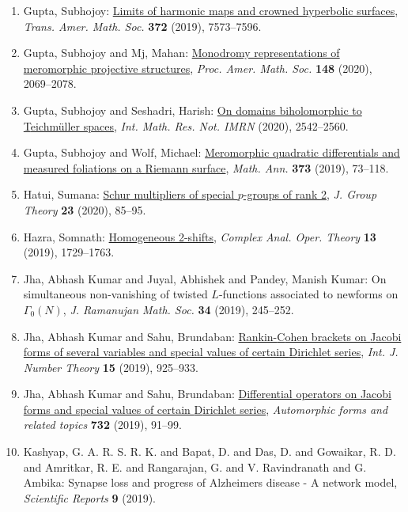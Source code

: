 \begin{enumerate}
{multishifts}, \emph{Proc. Amer. Math. Soc.} {\bf 147} (2019), 2599--2608.
\item Gupta, Subhojoy: \href{https://doi.org/10.1090/tran/7777}{Limits of harmonic maps and crowned hyperbolic surfaces}, \emph{Trans. Amer. Math. Soc.} {\bf 372} (2019), 7573--7596.
\item Gupta, Subhojoy and Mj, Mahan: \href{https://doi.org/10.1090/proc/14866}{Monodromy representations of meromorphic projective
structures}, \emph{Proc. Amer. Math. Soc.} {\bf 148} (2020), 2069--2078.
\item Gupta, Subhojoy and Seshadri, Harish: \href{https://doi.org/10.1093/imrn/rny204}{On domains biholomorphic to {T}eichm\"{u}ller spaces}, \emph{Int. Math. Res. Not. IMRN} {\bf } (2020), 2542--2560.
\item Gupta, Subhojoy and Wolf, Michael: \href{https://doi.org/10.1007/s00208-018-1674-z}{Meromorphic quadratic differentials and measured foliations on
a {R}iemann surface}, \emph{Math. Ann.} {\bf 373} (2019), 73--118.
\item Hatui, Sumana: \href{https://doi.org/10.1515/jgth-2019-0045}{Schur multipliers of special {$p$}-groups of rank 2}, \emph{J. Group Theory} {\bf 23} (2020), 85--95.
\item Hazra, Somnath: \href{https://doi.org/10.1007/s11785-018-0822-5}{Homogeneous 2-shifts}, \emph{Complex Anal. Oper. Theory} {\bf 13} (2019), 1729--1763.
\item Jha, Abhash Kumar and Juyal, Abhishek and Pandey, Manish
Kumar: On simultaneous non-vanishing of twisted {$L$}-functions
associated to newforms on {$\Gamma_0(N)$}, \emph{J. Ramanujan Math. Soc.} {\bf 34} (2019), 245--252.
\item Jha, Abhash Kumar and Sahu, Brundaban: \href{https://doi.org/10.1142/S1793042119500490}{Rankin-{C}ohen brackets on {J}acobi forms of several variables
and special values of certain {D}irichlet series}, \emph{Int. J. Number Theory} {\bf 15} (2019), 925--933.
\item Jha, Abhash Kumar and Sahu, Brundaban: \href{https://doi.org/10.1090/conm/732/14793}{Differential operators on {J}acobi forms and special values of
certain {D}irichlet series}, \emph{Automorphic forms and related topics} {\bf 732} (2019), 91--99.
\item Kashyap, G. A. R. S. R. K. and Bapat, D. and Das, D. and Gowaikar, R. D. and  Amritkar, R. E. and Rangarajan, G. and V. Ravindranath and G. Ambika: Synapse loss and progress of Alzheimers disease - A network model, \emph{Scientific Reports} {\bf 9} (2019).

\end{enumerate}
